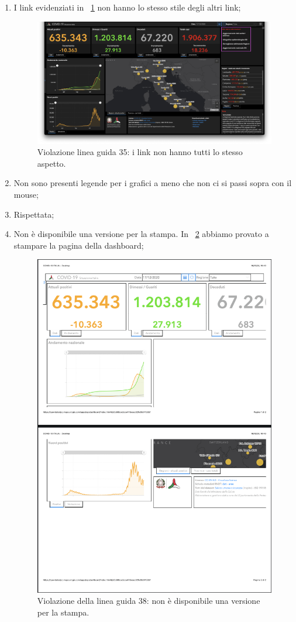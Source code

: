\begin{enumerate}
    \item I link evidenziati in ~\ref{fig:guidelines-violations-13} non hanno lo stesso stile degli altri link;
        \begin{figure}[H]
            \centering
            \includegraphics[width=0.5\columnwidth]{../../../assets/images/verifica-risorse-esistenti/guidelines_violations_15}
            \caption{Violazione linea guida 35: i link non hanno tutti lo stesso aspetto.}
            \label{fig:guidelines-violations-13}
        \end{figure}
    \item Non sono presenti legende per i grafici a meno che non ci si passi sopra con il mouse;
    \item Rispettata;
    \item Non è disponibile una versione per la stampa. In ~\ref{fig:guidelines-violations-14} abbiamo provato a stampare la pagina della dashboard;
        \begin{figure}[H]
            \centering
            \includegraphics[width=0.5\columnwidth]{../../../assets/images/verifica-risorse-esistenti/guidelines_violations_16}
            \caption{Violazione della linea guida 38: non è disponibile una versione per la stampa.}
            \label{fig:guidelines-violations-14}
        \end{figure}

\end{enumerate}
